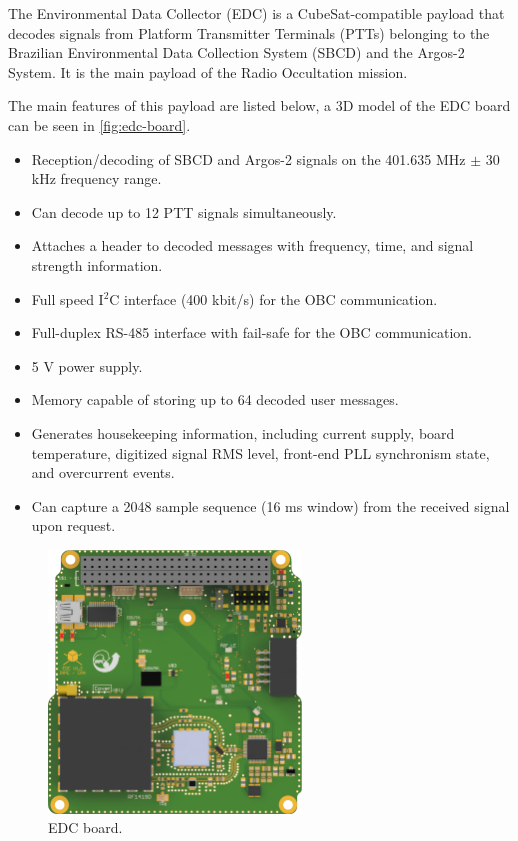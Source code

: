 The Environmental Data Collector (EDC) is a CubeSat-compatible payload that decodes signals from Platform Transmitter Terminals (PTTs) belonging to the Brazilian Environmental Data Collection System (SBCD) and the Argos-2 System. It is the main payload of the Radio Occultation mission.

The main features of this payload are listed below, a 3D model of the EDC board can be seen in \autoref{fig:edc-board}.

\begin{itemize}
    \item Reception/decoding of SBCD and Argos-2 signals on the 401.635 MHz $\pm$ 30 kHz frequency range.
    \item Can decode up to 12 PTT signals simultaneously.
    \item Attaches a header to decoded messages with frequency, time, and signal strength information.
    \item Full speed I$^{2}$C interface (400 kbit/s) for the OBC communication.
    \item Full-duplex RS-485 interface with fail-safe for the OBC communication.
    \item 5 V power supply.
    \item Memory capable of storing up to 64 decoded user messages.
    \item Generates housekeeping information, including current supply, board temperature, digitized signal RMS level, front-end PLL synchronism state, and overcurrent events.
    \item Can capture a 2048 sample sequence (16 ms window) from the received signal upon request.
\end{itemize}

\begin{figure}[!ht]
    \begin{center}
        \includegraphics[width=0.6\textwidth]{figures/edc-pcb-top}
        \caption{EDC board.}
        \label{fig:edc-board}
    \end{center}
\end{figure}

